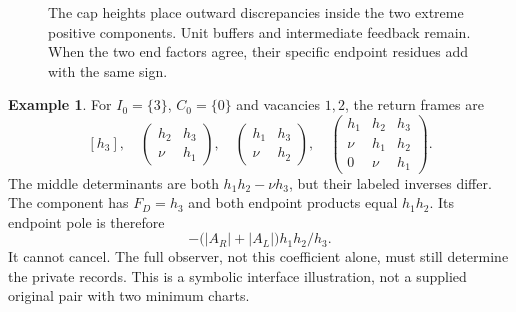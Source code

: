 \documentclass[11pt,a4paper]{amsart}
\numberwithin{equation}{section}
\theoremstyle{plain}
\theoremstyle{definition}
\newtheorem{example}[theorem]{Example}
\begin{document}
\begin{figure}[t]
\centering
{}
\caption{The cap heights place outward discrepancies inside the two extreme positive components.  Unit buffers and intermediate feedback remain.  When the two end factors agree, their specific endpoint residues add with the same sign.}\label{fig:end-poles}
\end{figure}

\begin{example}\label{ex:c3}
For \(I_0=\{3\}\), \(C_0=\{0\}\) and vacancies \(1,2\), the return frames are
\[
 [h_3],\quad
 \begin{pmatrix}h_2&h_3\\\nu&h_1\end{pmatrix},\quad
 \begin{pmatrix}h_1&h_3\\\nu&h_2\end{pmatrix},\quad
 \begin{pmatrix}h_1&h_2&h_3\\\nu&h_1&h_2\\0&\nu&h_1\end{pmatrix}.
\]
The middle determinants are both \(h_1h_2-\nu h_3\), but their labeled inverses differ.  The component has \(F_D=h_3\) and both endpoint products equal \(h_1h_2\).  Its endpoint pole is therefore
\[
 -\bigl(|A_R|+|A_L|\bigr)h_1h_2/h_3.
\]
It cannot cancel.  The full observer, not this coefficient alone, must still determine the private records.  This is a symbolic interface illustration, not a supplied original pair with two minimum charts.
\end{example}
\end{document}
